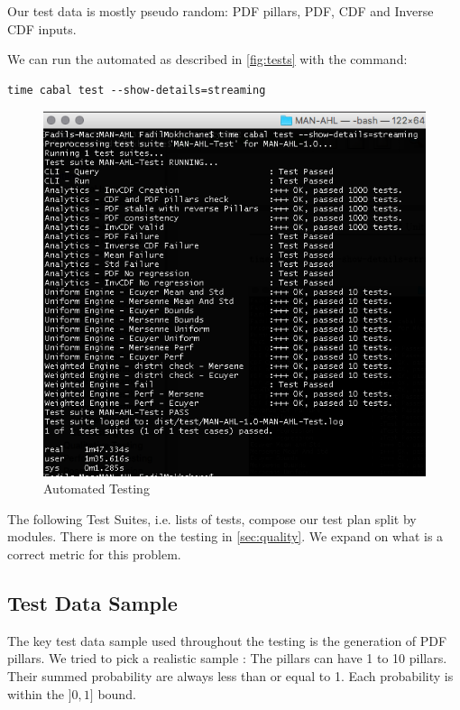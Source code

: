 \documentclass[12pt,a4paper,article]{memoir} %
\begin{document}
Our test data is mostly pseudo random: 
PDF pillars, PDF, CDF and Inverse CDF inputs.

We can run the automated as described in  \autoref{fig:tests} with the command:
\begin{verbatim}
time cabal test --show-details=streaming
\end{verbatim}
\begin{figure}[h!]
\begin{center}
\includegraphics[width=1\textwidth]{img/tests.png}
\caption{Automated Testing}
\label{fig:tests}
\end{center}
\end{figure}

The following Test Suites, i.e. lists of tests, compose our test plan split by modules.
There is more on the testing in \autoref{sec:quality}. We expand on what is a correct 
metric for this problem.

\subsection{Test Data Sample}

The key test data sample used throughout the testing 
is the generation of PDF pillars.
We tried to pick a realistic sample :
The pillars can have 1 to 10 pillars. Their summed probability are always less 
than or equal to 1.  Each probability is within the $]0, 1]$ bound.
\end{document}
